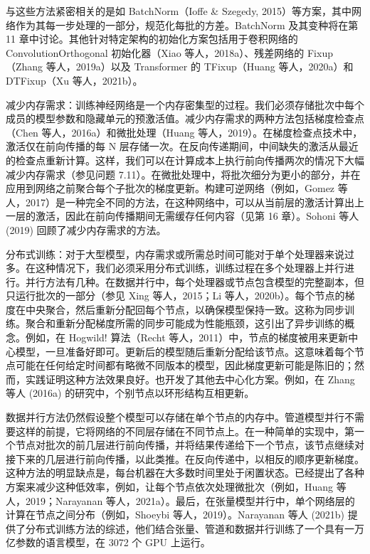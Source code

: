 \documentclass[lang=cn,newtx,10pt,scheme=chinese]{elegantbook}
\begin{document}
与这些方法紧密相关的是如 BatchNorm（Ioffe \& Szegedy, 2015）等方案，其中网络作为其每一步处理的一部分，规范化每批的方差。BatchNorm 及其变种将在第 11 章中讨论。其他针对特定架构的初始化方案包括用于卷积网络的 ConvolutionOrthogonal 初始化器（Xiao 等人，2018a）、残差网络的 Fixup（Zhang 等人，2019a）以及 Transformer 的 TFixup（Huang 等人，2020a）和 DTFixup（Xu 等人，2021b）。

减少内存需求：训练神经网络是一个内存密集型的过程。我们必须存储批次中每个成员的模型参数和隐藏单元的预激活值。减少内存需求的两种方法包括梯度检查点（Chen 等人，2016a）和微批处理（Huang 等人，2019）。在梯度检查点技术中，激活仅在前向传播的每 N 层存储一次。在反向传递期间，中间缺失的激活从最近的检查点重新计算。这样，我们可以在计算成本上执行前向传播两次的情况下大幅减少内存需求（参见问题 7.11）。在微批处理中，将批次细分为更小的部分，并在应用到网络之前聚合每个子批次的梯度更新。构建可逆网络（例如，Gomez 等人，2017）是一种完全不同的方法，在这种网络中，可以从当前层的激活计算出上一层的激活，因此在前向传播期间无需缓存任何内容（见第 16 章）。Sohoni 等人 (2019) 回顾了减少内存需求的方法。

分布式训练：对于大型模型，内存需求或所需总时间可能对于单个处理器来说过多。在这种情况下，我们必须采用分布式训练，训练过程在多个处理器上并行进行。并行方法有几种。在数据并行中，每个处理器或节点包含模型的完整副本，但只运行批次的一部分（参见 Xing 等人，2015；Li 等人，2020b）。每个节点的梯度在中央聚合，然后重新分配回每个节点，以确保模型保持一致。这称为同步训练。聚合和重新分配梯度所需的同步可能成为性能瓶颈，这引出了异步训练的概念。例如，在 Hogwild! 算法（Recht 等人，2011）中，节点的梯度被用来更新中心模型，一旦准备好即可。更新后的模型随后重新分配给该节点。这意味着每个节点可能在任何给定时间都有略微不同版本的模型，因此梯度更新可能是陈旧的；然而，实践证明这种方法效果良好。也开发了其他去中心化方案。例如，在 Zhang 等人 (2016a) 的研究中，个别节点以环形结构互相更新。

数据并行方法仍然假设整个模型可以存储在单个节点的内存中。管道模型并行不需要这样的前提，它将网络的不同层存储在不同节点上。在一种简单的实现中，第一个节点对批次的前几层进行前向传播，并将结果传递给下一个节点，该节点继续对接下来的几层进行前向传播，以此类推。在反向传递中，以相反的顺序更新梯度。这种方法的明显缺点是，每台机器在大多数时间里处于闲置状态。已经提出了各种方案来减少这种低效率，例如，让每个节点依次处理微批次（例如，Huang 等人，2019；Narayanan 等人，2021a）。最后，在张量模型并行中，单个网络层的计算在节点之间分布（例如，Shoeybi 等人，2019）。Narayanan 等人 (2021b) 提供了分布式训练方法的综述，他们结合张量、管道和数据并行训练了一个具有一万亿参数的语言模型，在 3072 个 GPU 上运行。
\end{document}

